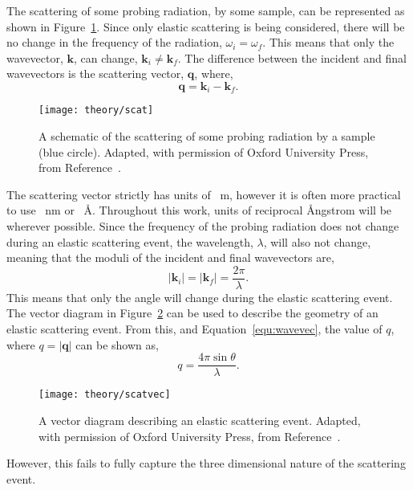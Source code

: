 The scattering of some probing radiation, by some sample, can be represented as shown in Figure~\ref{fig:scat}.
Since only elastic scattering is being considered, there will be no change in the frequency of the radiation, $\omega_i = \omega_f$.
This means that only the wavevector, $\mathbf{k}$, can change, $\mathbf{k}_i\neq \mathbf{k}_f$.
The difference between the incident and final wavevectors is the scattering vector, $\mathbf{q}$, where,
%
\begin{equation}
    \mathbf{q} = \mathbf{k}_i - \mathbf{k}_f.
\end{equation}
%
%
\begin{figure}
    \centering
    \texttt{[image: theory/scat]}
    \caption{A schematic of the scattering of some probing radiation by a sample (blue circle). Adapted, with permission of Oxford University Press\textsuperscript{\textcopyright}, from Reference~\cite{sivia_elementary_2011}.}
    \label{fig:scat}
\end{figure}
%
The scattering vector strictly has units of \si{\per\meter}, however it is often more practical to use \si{\per\nano\meter} or \si{\per\angstrom}.
Throughout this work, units of reciprocal \AA ngstrom will be wherever possible.
Since the frequency of the probing radiation does not change during an elastic scattering event, the wavelength, $\lambda$, will also not change, meaning that the moduli of the incident and final wavevectors are,
%
\begin{equation}
    |\mathbf{k}_i| = |\mathbf{k}_f|=\frac{2\pi}{\lambda}.
    \label{equ:wavevec}
\end{equation}
%
This means that only the angle will change during the elastic scattering event.
The vector diagram in Figure~\ref{fig:scatvec} can be used to describe the geometry of an elastic scattering event.
From this, and Equation~\ref{equ:wavevec}, the value of $q$, where $q = |\mathbf{q}|$ can be shown as,
%
\begin{equation}
    q = \frac{4\pi\sin{\theta}}{\lambda}.
    \label{equ:theq}
\end{equation}
%
%
\begin{figure}
    \centering
    \texttt{[image: theory/scatvec]}
    \caption{A vector diagram describing an elastic scattering event. Adapted, with permission of Oxford University Press\textsuperscript{\textcopyright}, from Reference~\cite{sivia_elementary_2011}.}
    \label{fig:scatvec}
\end{figure}
%
However, this fails to fully capture the three dimensional nature of the scattering event.

